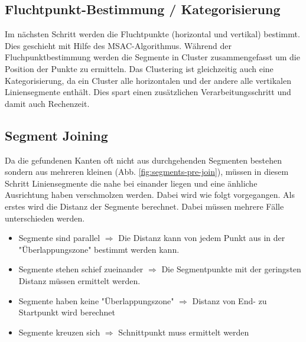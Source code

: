 \subsection{Fluchtpunkt-Bestimmung / Kategorisierung}
Im nächsten Schritt werden die Fluchtpunkte (horizontal und vertikal) bestimmt. Dies geschieht mit Hilfe des MSAC-Algorithmus. Während der Fluchpunktbestimmung werden die Segmente in Cluster zusammengefasst um die Position der Punkte zu ermitteln. Das Clustering ist gleichzeitig auch eine Kategorisierung, da ein Cluster alle horizontalen und der andere alle vertikalen Liniensegmente enthält. Dies spart einen zusätzlichen Verarbeitungsschritt und damit auch Rechenzeit.

\subsection{Segment Joining}
Da die gefundenen Kanten oft nicht aus durchgehenden Segmenten bestehen sondern aus mehreren kleinen (Abb. \ref{fig:segments-pre-join}), müssen in diesem Schritt Liniensegmente die nahe bei einander liegen und eine änhliche Ausrichtung haben verschmolzen werden. Dabei wird wie folgt vorgegangen. Als erstes wird die Distanz der Segmente berechnet. Dabei müssen mehrere Fälle unterschieden werden.

\begin{itemize}
	\item Segmente sind parallel $\Rightarrow$ Die Distanz kann von jedem Punkt aus in der "Überlappungszone" bestimmt werden kann.
	\item Segmente stehen schief zueinander $\Rightarrow$ Die Segmentpunkte mit der geringsten Distanz müssen ermittelt werden.
	\item Segmente haben keine "Überlappungszone" $\Rightarrow$ Distanz von End- zu Startpunkt wird berechnet
	\item Segmente kreuzen sich $\Rightarrow$ Schnittpunkt muss ermittelt werden
\end{itemize}

